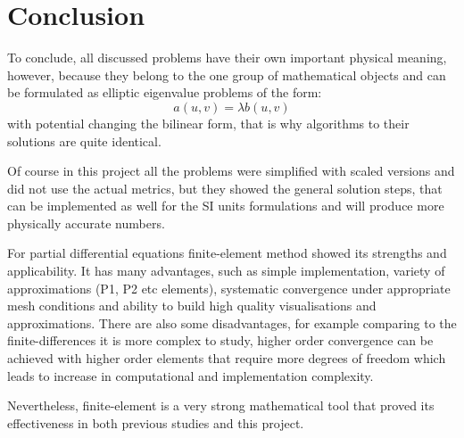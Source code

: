 \documentclass[conference]{IEEEtran}
\begin{document}
\section{Conclusion}
To conclude, all discussed problems have their own important physical meaning, however, because they belong to the one group of mathematical objects and can be formulated as elliptic eigenvalue problems of the form:
\begin{equation}
    a(u, v) = \lambda b(u, v)
\end{equation}
with potential changing the bilinear form, that is why algorithms to their solutions are quite identical. 

Of course in this project all the problems were simplified with scaled versions and did not use the actual metrics, but they showed the general solution steps, that can be implemented as well for the SI units formulations and will produce more physically accurate numbers.

For partial differential equations finite-element method showed its strengths and applicability. It has many advantages, such as simple implementation, variety of approximations (P1, P2 etc elements), systematic convergence under appropriate mesh conditions and ability to build high quality visualisations and approximations. There are also some disadvantages, for example comparing to the finite-differences it is more complex to study, higher order convergence can be achieved with higher order elements that require more degrees of freedom which leads to increase in computational and implementation complexity.

Nevertheless, finite-element is a very strong mathematical tool that proved its effectiveness in both previous studies and this project.
\end{document}
